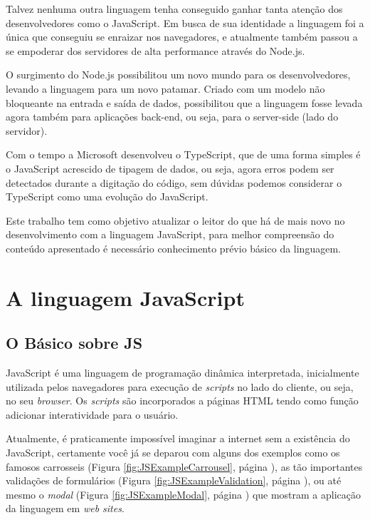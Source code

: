 \documentclass[
	12pt,				%
	openright,			%
	twoside,			%
	a4paper,			%
	english,			%
	brazil				%
	]{abntex2}
\begin{document}
Talvez nenhuma outra linguagem tenha conseguido ganhar tanta atenção dos desenvolvedores como o JavaScript. Em busca de  sua identidade a linguagem foi a única que conseguiu se enraizar nos navegadores, e atualmente também passou a se empoderar dos servidores de alta performance através do Node.js.

O surgimento do Node.js possibilitou um novo mundo para os desenvolvedores,
levando a linguagem para um novo patamar. Criado com um modelo não bloqueante na
entrada e saída de dados, possibilitou que a linguagem fosse levada agora também para
aplicações back-end, ou seja, para o server-side (lado do servidor).

Com o tempo a Microsoft desenvolveu o TypeScript, que de uma forma simples é o
JavaScript acrescido de tipagem de dados, ou seja, agora erros podem ser detectados
durante a digitação do código, sem dúvidas podemos considerar o TypeScript como uma
evolução do JavaScript.

Este trabalho tem como objetivo atualizar o leitor do que há de mais novo no desenvolvimento com a linguagem JavaScript, para melhor compreensão do conteúdo apresentado é necessário conhecimento prévio básico da linguagem. 


\part{A linguagem JavaScript}
\chapter{O Básico sobre JS}

JavaScript é uma linguagem de programação dinâmica interpretada, inicialmente utilizada pelos navegadores para execução de \textit{scripts} no lado do cliente, ou seja, no seu \textit{browser}. Os \textit{scripts} são incorporados a páginas HTML tendo como função adicionar interatividade para o usuário.

Atualmente, é praticamente impossível imaginar a internet sem a existência do JavaScript, certamente você já se deparou com alguns dos exemplos como os famosos carrosseis (Figura \ref{fig:JSExampleCarrousel}, página \pageref{fig:JSExampleCarrousel}), as tão importantes validações de formulários (Figura \ref{fig:JSExampleValidation}, página \pageref{fig:JSExampleValidation}), ou até mesmo o \textit{modal} (Figura \ref{fig:JSExampleModal}, página \pageref{fig:JSExampleModal}) que mostram a aplicação da linguagem em \textit{web sites}.
\end{document}
